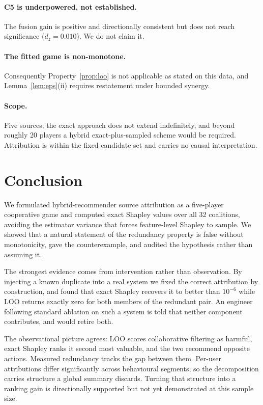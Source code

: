 \documentclass[11pt]{article}
\begin{document}
\paragraph{C5 is underpowered, not established.} The fusion gain is positive
and directionally consistent but does not reach significance
($d_z = 0.010$). We do not claim it.

\paragraph{The fitted game is non-monotone.} Consequently
Property~\ref{prop:loo} is not applicable as stated on this data, and
Lemma~\ref{lem:eps}(ii) requires restatement under bounded synergy.

\paragraph{Scope.} Five sources; the exact approach does not extend
indefinitely, and beyond roughly 20 players a hybrid exact-plus-sampled scheme
would be required. Attribution is within the fixed candidate set and carries no
causal interpretation.

\section{Conclusion}

We formulated hybrid-recommender source attribution as a five-player
cooperative game and computed exact Shapley values over all 32 coalitions,
avoiding the estimator variance that forces feature-level Shapley to sample. We
showed that a natural statement of the redundancy property is false without
monotonicity, gave the counterexample, and audited the hypothesis rather than
assuming it.

The strongest evidence comes from intervention rather than observation. By
injecting a known duplicate into a real system we fixed the correct
attribution by construction, and found that exact Shapley recovers it to
better than $10^{-6}$ while LOO returns exactly zero for both members of the
redundant pair. An engineer following standard ablation on such a system is
told that neither component contributes, and would retire both.

The observational picture agrees: LOO scores collaborative filtering as
harmful, exact Shapley ranks it second most valuable, and the two recommend
opposite actions. Measured redundancy tracks the gap between them. Per-user attributions differ
significantly across behavioural segments, so the decomposition carries
structure a global summary discards. Turning that structure into a ranking gain
is directionally supported but not yet demonstrated at this sample size.
\end{document}

